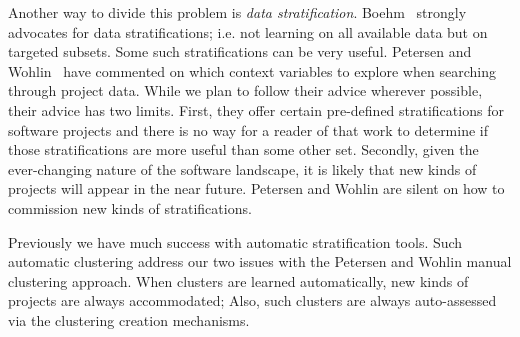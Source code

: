 Another way to divide this problem is {\em data stratification}. Boehm~\cite{Boehm:2006} strongly
advocates for data stratifications; i.e. not learning on all available data but on targeted subsets.
Some such stratifications can  be very useful. 
Petersen and Wohlin~\cite{Petersen2009} have commented on which context variables to explore when searching through project data.
While we plan to follow their advice wherever possible, their advice has two limits. First, they offer certain pre-defined stratifications for software projects and there is no way for a reader of that work to determine if those stratifications are more useful than some other set. Secondly, given the ever-changing nature of the software landscape, it is likely that new kinds of projects
will appear in the near future. Petersen and Wohlin are silent on how to commission new kinds of stratifications.

Previously we have much success with automatic stratification tools. Such automatic clustering
address our two issues with the Petersen and Wohlin manual clustering approach.
When  clusters are learned automatically,   new kinds of projects are always accommodated;
Also, 
such clusters are always auto-assessed via the clustering creation mechanisms.


